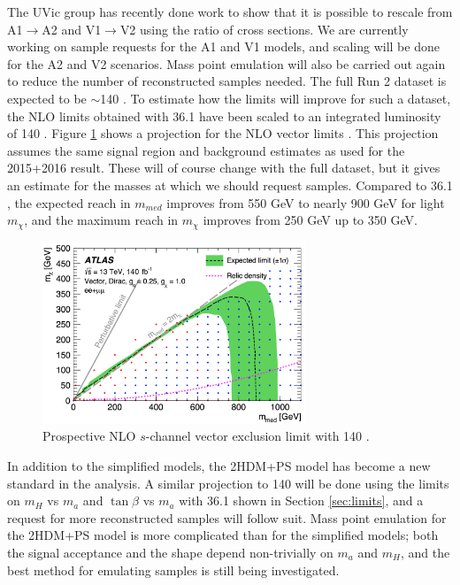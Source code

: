 \noindent The UVic group has recently done work to show that it is possible to rescale from A1$\rightarrow$A2 and V1$\rightarrow$V2 using the ratio of cross sections. We are currently working on sample requests for the A1 and V1 models, and scaling will be done for the A2 and V2 scenarios. Mass point emulation will also be carried out again to reduce the number of reconstructed samples needed. The full Run 2 dataset is expected to be $\sim$140 \ifb. To estimate how the limits will improve for such a dataset, the NLO limits obtained with 36.1 \ifb have been scaled to an integrated luminosity of 140 \ifb. Figure \ref{fig:140limits} shows a projection for the NLO vector limits \cite{ChrisA}. This projection assumes the same signal region and background estimates as used for the 2015+2016 result. These will of course change with the full dataset, but it gives an estimate for the masses at which we should request samples. Compared to 36.1 \ifb, the expected reach in $m_{med}$ improves from 550 GeV to nearly 900 GeV for light $m_\chi$, and the maximum reach in $m_\chi$ improves from 250 GeV up to 350 GeV.

\begin{figure}[htb]
\centering
\includegraphics[width=0.7\textwidth]{Figures/140ifb.png}
\caption{Prospective NLO $s$-channel vector exclusion limit with 140 \ifb \cite{ChrisA}.}
\label{fig:140limits}
\end{figure}

In addition to the simplified models, the 2HDM+PS model has become a new standard in the analysis. A similar projection to 140 \ifb will be done using the limits on $m_H$ vs $m_a$ and $\tan \beta$ vs $m_a$ with 36.1 \ifb shown in Section \ref{sec:limits}, and a request for more reconstructed samples will follow suit. Mass point emulation for the 2HDM+PS model is more complicated than for the simplified models; both the signal acceptance and the \etmiss shape depend non-trivially on $m_a$ and $m_H$, and the best method for emulating samples is still being investigated.

